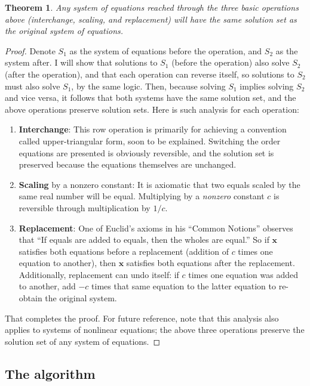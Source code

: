 \documentclass[draft,12pt]{report}
\newtheorem{theorem}{Theorem}
\renewcommand{\vec}[1]{\mathbf{#1}}
\begin{document}
\begin{theorem}
    Any system of equations reached through the three basic operations above (interchange, scaling, and replacement) will have the same solution set as the original system of equations.
\end{theorem}
\begin{proof}
    Denote $S_1$ as the system of equations before the operation, and $S_2$ as the system after. I will show that solutions to $S_1$ (before the operation) also solve $S_2$ (after the operation), and that each operation can reverse itself, so solutions to $S_2$ must also solve $S_1$, by the same logic. Then, because solving $S_1$ implies solving $S_2$ and vice versa, it follows that both systems have the same solution set, and the above operations preserve solution sets. Here is such analysis for each operation:
    \begin{enumerate}
        \item \textbf{Interchange}: This row operation is primarily for achieving a convention called upper-triangular form, soon to be explained. Switching the order equations are presented is obviously reversible, and the solution set is preserved because the equations themselves are unchanged.
        \item \textbf{Scaling} by a nonzero constant: It is axiomatic that two equals scaled by the same real number will be equal. Multiplying by a \emph{nonzero} constant $c$ is reversible through multiplication by $1/c$.
        \item \textbf{Replacement}: One of Euclid's axioms in his ``Common Notions'' observes that ``If equals are added to equals, then the wholes are equal.'' So if $\vec{x}$ satisfies both equations before a replacement (addition of $c$ times one equation to another), then $\vec{x}$ satisfies both equations after the replacement. Additionally, replacement can undo itself: if $c$ times one equation was added to another, add $-c$ times that same equation to the latter equation to re-obtain the original system.
    \end{enumerate}
    That completes the proof. For future reference, note that this analysis also applies to systems of nonlinear equations; the above three operations preserve the solution set of any system of equations.
\end{proof}

\subsection{The algorithm}
\end{document}

